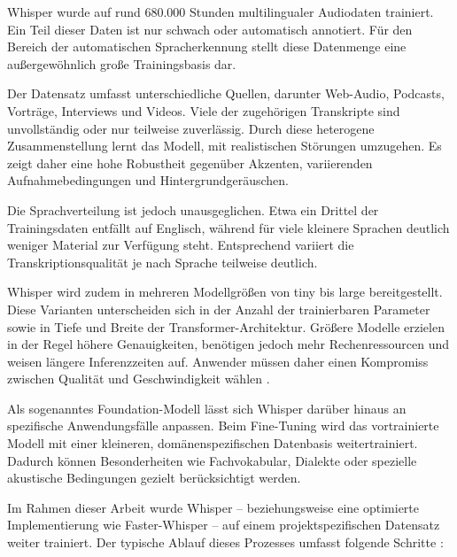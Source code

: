 Whisper wurde auf rund 680.000 Stunden multilingualer Audiodaten trainiert. Ein Teil dieser Daten ist nur schwach oder automatisch annotiert. Für den Bereich der automatischen Spracherkennung stellt diese Datenmenge eine außergewöhnlich große Trainingsbasis dar.

Der Datensatz umfasst unterschiedliche Quellen, darunter Web-Audio, Podcasts, Vorträge, Interviews und Videos. Viele der zugehörigen Transkripte sind unvollständig oder nur teilweise zuverlässig. Durch diese heterogene Zusammenstellung lernt das Modell, mit realistischen Störungen umzugehen. Es zeigt daher eine hohe Robustheit gegenüber Akzenten, variierenden Aufnahmebedingungen und Hintergrundgeräuschen.

Die Sprachverteilung ist jedoch unausgeglichen. Etwa ein Drittel der Trainingsdaten entfällt auf Englisch, während für viele kleinere Sprachen deutlich weniger Material zur Verfügung steht. Entsprechend variiert die Transkriptionsqualität je nach Sprache teilweise deutlich.

Whisper wird zudem in mehreren Modellgrößen von tiny bis large bereitgestellt. Diese Varianten unterscheiden sich in der Anzahl der trainierbaren Parameter sowie in Tiefe und Breite der Transformer-Architektur. Größere Modelle erzielen in der Regel höhere Genauigkeiten, benötigen jedoch mehr Rechenressourcen und weisen längere Inferenzzeiten auf. Anwender müssen daher einen Kompromiss zwischen Qualität und Geschwindigkeit wählen \cite{Radford2022}. 

Als sogenanntes Foundation-Modell lässt sich Whisper darüber hinaus an spezifische Anwendungsfälle anpassen. Beim Fine-Tuning wird das vortrainierte Modell mit einer kleineren, domänenspezifischen Datenbasis weitertrainiert. Dadurch können Besonderheiten wie Fachvokabular, Dialekte oder spezielle akustische Bedingungen gezielt berücksichtigt werden.

\newpage
Im Rahmen dieser Arbeit wurde Whisper – beziehungsweise eine optimierte Implementierung wie Faster-Whisper – auf einem projektspezifischen Datensatz weiter trainiert. Der typische Ablauf dieses Prozesses umfasst folgende Schritte \cite{yan}:

